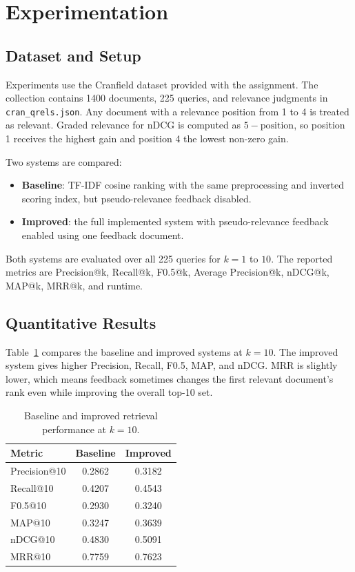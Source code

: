 \section{Experimentation}\label{sec:exp}

\subsection{Dataset and Setup}

Experiments use the Cranfield dataset provided with the assignment. The
collection contains 1400 documents, 225 queries, and relevance judgments in
\texttt{cran\_qrels.json}. Any document with a relevance position from 1 to 4 is
treated as relevant. Graded relevance for nDCG is computed as $5-\text{position}$,
so position 1 receives the highest gain and position 4 the lowest non-zero gain.

Two systems are compared:

\begin{itemize}
    \item \textbf{Baseline}: TF-IDF cosine ranking with the same preprocessing
    and inverted scoring index, but pseudo-relevance feedback disabled.
    \item \textbf{Improved}: the full implemented system with pseudo-relevance
    feedback enabled using one feedback document.
\end{itemize}

Both systems are evaluated over all 225 queries for $k=1$ to $10$. The reported
metrics are Precision@k, Recall@k, F0.5@k, Average Precision@k, nDCG@k, MAP@k,
MRR@k, and runtime.

\subsection{Quantitative Results}

Table~\ref{tab:main_results} compares the baseline and improved systems at
$k=10$. The improved system gives higher Precision, Recall, F0.5, MAP, and nDCG.
MRR is slightly lower, which means feedback sometimes changes the first relevant
document's rank even while improving the overall top-10 set.

\begin{table}[h]
\centering
\caption{Baseline and improved retrieval performance at $k=10$.}
\label{tab:main_results}
\begin{tabular}{lcc}
\hline
Metric & Baseline & Improved \\
\hline
Precision@10 & 0.2862 & 0.3182 \\
Recall@10 & 0.4207 & 0.4543 \\
F0.5@10 & 0.2930 & 0.3240 \\
MAP@10 & 0.3247 & 0.3639 \\
nDCG@10 & 0.4830 & 0.5091 \\
MRR@10 & 0.7759 & 0.7623 \\
\hline
\end{tabular}
\end{table}

